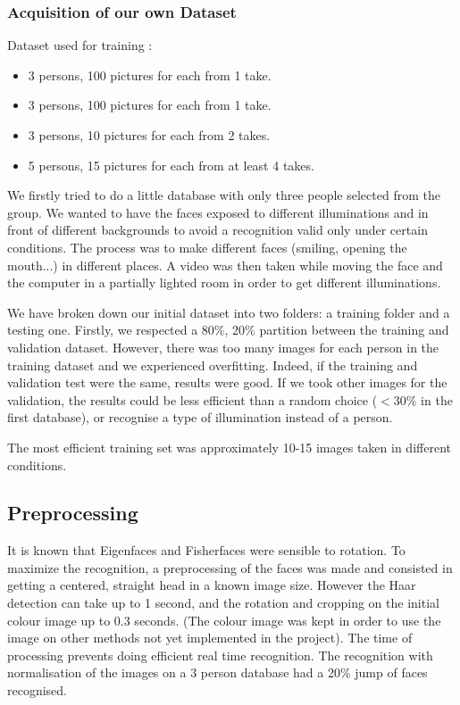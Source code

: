 \subsubsection{Acquisition of our own Dataset}
Dataset used for training :
\begin{itemize}
 \item 3 persons, 100 pictures for each from 1 take.  
\item 3 persons, 100 pictures for each from 1 take.
\item 3 persons, 10 pictures for each from 2 takes.
\item 5 persons, 15 pictures for each from at least 4 takes.
\end{itemize}
We firstly tried to do a little database with only three people selected from the group. We wanted to have the faces exposed to different illuminations and in front of different backgrounds to avoid a recognition valid only under certain conditions. The process was to make different faces (smiling, opening the mouth...) in different places. A video was then taken while moving the face and the computer in a partially lighted room in order to get different illuminations. 

We have broken down our initial dataset into two folders: a training folder and a testing one. Firstly, we respected a 80\%, 20\% partition between the training and validation dataset. However, there was too many images for each person in the training dataset and we experienced overfitting. Indeed, if the training and validation test were the same, results were good. If we took other images for the validation, the results could be less efficient than a random choice ($<$30\% in the first database), or recognise a type of illumination instead of a person.

The most efficient training set was approximately 10-15 images taken in different conditions. 

\subsection{Preprocessing}
\label{Implementation:preprocessing}
It is known that Eigenfaces and Fisherfaces were sensible to rotation. To maximize the recognition, a preprocessing of the faces was made and consisted in getting a centered, straight head in a known image size. However the Haar detection can take up to 1 second, and the rotation and cropping on the initial colour image up to 0.3 seconds. (The colour image was kept in order to use the image on other methods not yet implemented in the project). The time of processing prevents doing efficient real time recognition. The recognition with normalisation of the images on a 3 person database had a 20\% jump of faces recognised.


